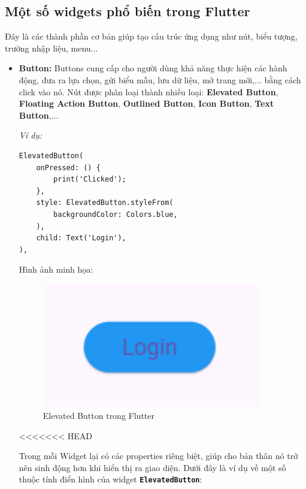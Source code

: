 \documentclass[../DoAn.tex]{subfiles}
\numberwithin{figure}{chapter}
\begin{document}
\subsection{Một số widgets phổ biến trong Flutter}
Đây là các thành phần cơ bản giúp tạo cấu trúc ứng dụng như nút, biểu tượng, trường nhập liệu, menu...
\begin{itemize}
\item \textbf{Button: } Buttons cung cấp cho người dùng khả năng thực hiện các hành động, đưa ra lựa chọn, gửi biểu mẫu, lưu dữ liệu, mở trang mới,... bằng cách click vào nó. Nút được phân loại thành nhiều loại: \textbf{Elevated Button}, \textbf{Floating Action Button}, \textbf{Outlined Button}, \textbf{Icon Button}, \textbf{Text Button},...

\textit{Ví dụ:}
\begin{lstlisting}
ElevatedButton(
    onPressed: () {
        print('Clicked'); 
    },
    style: ElevatedButton.styleFrom(
        backgroundColor: Colors.blue, 
    ),
    child: Text('Login'),
),
\end{lstlisting}

Hình ảnh minh họa:
\begin{figure}[H]
    \centering
    \includegraphics[width=0.9\textwidth]{Hinhve/Chuong5/buttonWidget.png}
    \caption{Elevated Button trong Flutter}
    \label{fig:buttonwidget}
\end{figure}
<<<<<<< HEAD

Trong mỗi Widget lại có các properties riêng biệt, giúp cho bản thân nó trở nên sinh động hơn khi hiển thị ra giao diện. Dưới đây là ví dụ về một số thuộc tính điển hình của widget \textbf{\texttt{ElevatedButton}}:


\end{itemize}
\end{document}
